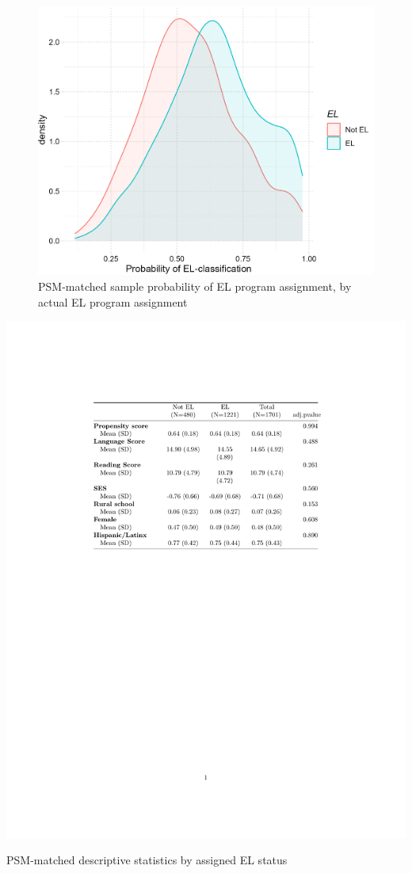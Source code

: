 \documentclass[a4paper, 11pt]{article}
\begin{document}
\begin{enumerate}
	\begin{figure}
		\begin{center}
			\includegraphics[scale=0.7]{figures/psm_common_support.png}
			\caption{PSM-matched sample probability of EL program assignment, by actual EL program assignment} \label{psm_common}
		\end{center}
	\end{figure}

\begin{table}
\includegraphics{tables/psm_descriptives2.pdf}
		\caption{PSM-matched descriptive statistics by assigned EL status \label{tab:psm}}
\end{table}


\end{enumerate}
\end{document}
